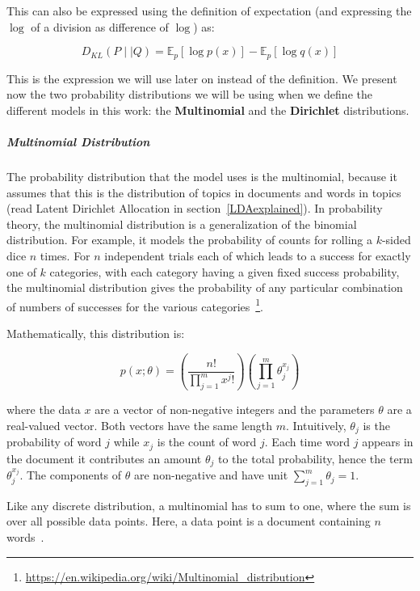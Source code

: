 \documentclass[12pt]{report}
\begin{document}
This can also be expressed using the definition of expectation (and
expressing the $\log$ of a division as difference of $\log$) as:

\begin{equation}
D_{KL}(P \mid \mid Q) = \mathbb{E}_{p}[\log{p(x)}] - \mathbb{E}_{p}[\log{q(x)}]
\end{equation}

This is the expression we will use later on instead of the definition.
We present now the two probability distributions we will be using when
we define the different models in this work: the \textbf{Multinomial}
and the \textbf{Dirichlet} distributions.


\subparagraph{Multinomial Distribution}

The probability distribution that the model uses is the multinomial, 
because it assumes that this is the distribution of topics in 
documents and words in topics (read Latent Dirichlet Allocation in section~\ref{LDAexplained}). 
In probability theory, the multinomial distribution is a generalization
of the binomial distribution. For example, it models the probability
of counts for rolling a $k$-sided dice $n$ times. For $n$ independent trials
each of which leads to a success for exactly one of $k$ categories, with
each category having a given fixed success probability, the
multinomial distribution gives the probability of any particular
combination of numbers of successes for the various
categories~\footnote{\url{https://en.wikipedia.org/wiki/Multinomial_distribution}}.

Mathematically, this distribution is: 

\begin{equation}
p(x;\theta) = \left(\frac{n!}{\prod\limits_{j=1}^m x^j!}\right)\left
(\prod\limits_{j=1}^m \theta_j^{x_j}\right)
\end{equation}

where the data $x$ are a vector of non-negative integers and the parameters
$\theta$ are a real-valued vector. Both vectors have the same length $m$.
Intuitively, $\theta_j$ is the probability of word $j$ while $x_j$ is the count
of word $j$. Each time word $j$ appears in the document it contributes an amount
$\theta_j$ to the total probability, hence the term $\theta_j^{x_j}$. The
components of $\theta$ are non-negative and have unit $\sum\limits_{j=1}^m
\theta_j = 1$.

Like any discrete distribution, a multinomial has to sum to one, where the sum
is over all possible data points. Here, a data point is a document containing
$n$ words~\cite{Huang_maximumlikelihood}.
\end{document}
